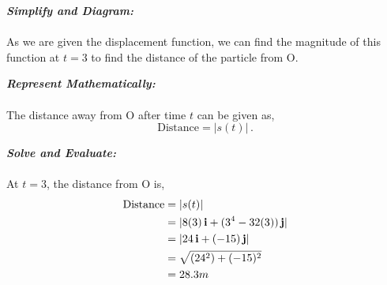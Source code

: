 \begin{subquestions}
\begin{subsubquestions}
\subsubquestion

\textbf{\textit{Simplify and Diagram:}} \\ \\
As we are given the displacement function, we can find the magnitude of this function at $t=3$ to find the distance of the particle from O.




\textbf{\textit{Represent Mathematically:}} \\ \\
The distance away from O after time $t$ can be given as,
\begin{equation}
	\text{Distance} = |s(t)| \,.
\end{equation}




\textbf{\textit{Solve and Evaluate:}} \\ \\
At $t=3$, the distance from O is,
\begin{align}
	\text{Distance} & = |s(t)| \nonumber \\
	                & = |8(3)\,\mathbf{i} + (3^4-32(3))\,\mathbf{j}| \nonumber \\
	                & = |24\,\mathbf{i} + (-15)\,\mathbf{j}| \nonumber \\
	                & = \sqrt{(24^2)+(-15)^2} \nonumber \\
	                & = 28.3m
\end{align}




 
	
	
	
	
	
	
\end{subsubquestions}












	

	
	
	
\end{subquestions}









